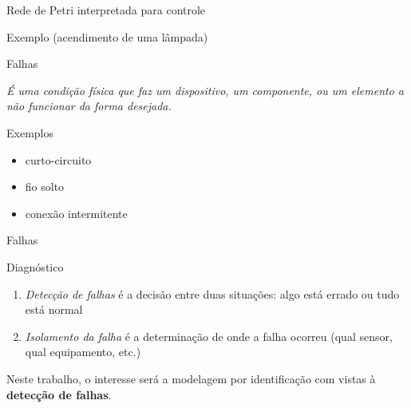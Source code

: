 \documentclass[xcolor=x11names,compress,framenumber]{beamer}
\renewcommand{\(}{\begin{columns}}
\renewcommand{\)}{\end{columns}}
\newcommand{\<}[1]{\begin{column}{#1}}
\renewcommand{\>}{\end{column}}
\begin{document}
\begin{frame}{Rede de Petri interpretada para controle}
\begin{block}{Exemplo (acendimento de uma lâmpada)}
\begin{figure}
\centering
{}
\label{fig:ex rpic}
\end{figure}
\end{block}
\end{frame}

\begin{frame}{Falhas}

	\begin{block}{}
		\emph{É uma condição física que faz um dispositivo, um componente, ou um elemento a não funcionar da forma desejada.} 
	\end{block}
	
	\begin{block}{Exemplos}
		\begin{itemize}
			\item curto-circuito
			\item fio solto
			\item conexão intermitente
		\end{itemize}
	\end{block}

\end{frame}

\begin{frame}{Falhas}
	
	\begin{block}{Diagnóstico}
		\begin{enumerate}
			\vspace{0.5cm}
			\item \textit{Detecção de falhas} é a decisão entre duas situações: algo está errado ou tudo está normal
			\vspace{0.5cm}
			\item \textit{Isolamento da falha} é a determinação de onde a falha ocorreu (qual sensor, qual equipamento, etc.)
		\end{enumerate}	
	\end{block}

	\begin{block}{}
		Neste trabalho, o interesse será a modelagem por identificação com vistas à \textbf{detecção de falhas}.
	\end{block}
	
\end{frame}
	
\end{document}
